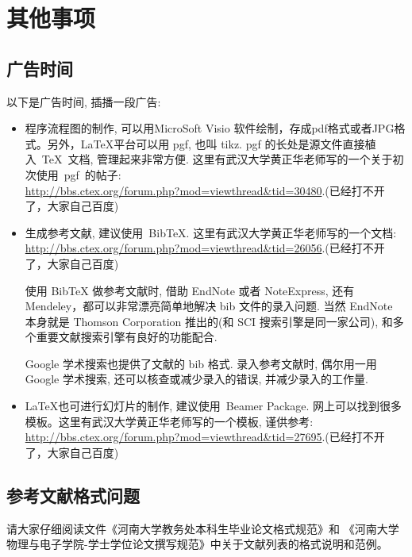 \documentclass[forprint]{HedaBachelor}
\begin{document}

\chapter{其他事项}

\section{广告时间}
以下是广告时间, 插播一段广告:
\begin{itemize}
    \item 程序流程图的制作, 可以用MicroSoft Visio 软件绘制，存成pdf格式或者JPG格式。另外，\LaTeX 平台可以用 pgf, 也叫 tikz.
          pgf 的长处是源文件直接植入~\TeX~文档, 管理起来非常方便.
    这里有武汉大学黄正华老师写的一个关于初次使用~pgf~的帖子:\\    \url{http://bbs.ctex.org/forum.php?mod=viewthread&tid=30480}.(已经打不开了，大家自己百度)
    \item 生成参考文献, 建议使用~BibTeX. 这里有武汉大学黄正华老师写的一个文档: \\
    \url{http://bbs.ctex.org/forum.php?mod=viewthread&tid=26056}.(已经打不开了，大家自己百度)

          {\kaishu 使用 BibTeX{} 做参考文献时,
      借助 EndNote 或者 NoteExpress, 还有Mendeley，都可以非常漂亮简单地解决 bib 文件的录入问题.
      当然 EndNote 本身就是 Thomson Corporation 推出的(和 SCI 搜索引擎是同一家公司), 和多个重要文献搜索引擎有良好的功能配合.

      Google 学术搜索也提供了文献的 bib 格式.
      录入参考文献时, 偶尔用一用 Google 学术搜索, 还可以核查或减少录入的错误, 并减少录入的工作量.}

    \item \LaTeX 也可进行幻灯片的制作, 建议使用~Beamer Package. 网上可以找到很多模板。这里有武汉大学黄正华老师写的一个模板, 谨供参考:\\
    \url{http://bbs.ctex.org/forum.php?mod=viewthread&tid=27695}.(已经打不开了，大家自己百度)
\end{itemize}

\section{参考文献格式问题}

请大家仔细阅读文件《河南大学教务处本科生毕业论文格式规范》和 《河南大学物理与电子学院-学士学位论文撰写规范》中关于文献列表的格式说明和范例。
\end{document}
